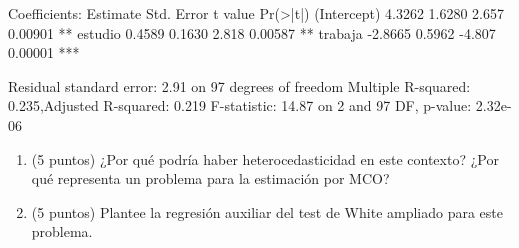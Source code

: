 \documentclass[10pt,a4paper]{article}
\begin{document}
\begin{enumerate}
{\begin{minipage}{0.95\textwidth}
Coefficients:\newline
\hspace*{1em}Estimate \hspace{1em} Std. Error \hspace{1em} t value \hspace{1em} Pr(>|t|)\newline
(Intercept) \hspace{0.6em} 4.3262 \hspace{2em} 1.6280 \hspace{2em} 2.657 \hspace{2em} 0.00901 **\newline
estudio \hspace{2.3em} 0.4589 \hspace{2em} 0.1630 \hspace{2em} 2.818 \hspace{2em} 0.00587 **\newline
trabaja \hspace{2.3em} -2.8665 \hspace{1.9em} 0.5962 \hspace{2em} -4.807 \hspace{1.7em} 0.00001 ***\newline

Residual standard error: 2.91 on 97 degrees of freedom\newline
Multiple R-squared: 0.235,\quad Adjusted R-squared: 0.219\newline
F-statistic: 14.87 on 2 and 97 DF, \quad p-value: 2.32e-06
\end{minipage}
}

\begin{enumerate}
    \item (5 puntos) ¿Por qué podría haber heterocedasticidad en este contexto? ¿Por qué representa un problema para la estimación por MCO?


    \item (5 puntos) Plantee la regresión auxiliar del test de White ampliado para este problema.


\end{enumerate}
\end{enumerate}
\end{document}
